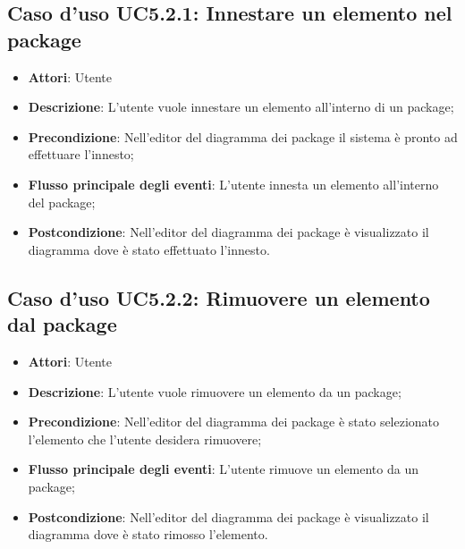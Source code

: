 \documentclass[../AnalisiDeiRequisiti.tex]{subfiles}
\begin{document}
			\subsection{Caso d'uso UC5.2.1: Innestare un elemento nel package}
			\begin{itemize}
				\item \textbf{Attori}: Utente
				\item \textbf{Descrizione}: L'utente vuole innestare un elemento all'interno di un package;
				\item \textbf{Precondizione}: Nell'editor del diagramma dei package il sistema è pronto ad effettuare l'innesto;
				\item \textbf{Flusso principale degli eventi}: L'utente innesta un elemento all'interno del package;
				\item \textbf{Postcondizione}: Nell'editor del diagramma dei package è visualizzato il diagramma dove è stato effettuato l'innesto.
			\end{itemize}
			\subsection{Caso d'uso UC5.2.2: Rimuovere un elemento dal package}
			\begin{itemize}
				\item \textbf{Attori}: Utente
				\item \textbf{Descrizione}: L'utente vuole rimuovere un elemento da un package;
				\item \textbf{Precondizione}: Nell'editor del diagramma dei package è stato selezionato l'elemento che l'utente desidera rimuovere;
				\item \textbf{Flusso principale degli eventi}: L'utente rimuove un elemento da un package;
				\item \textbf{Postcondizione}: Nell'editor del diagramma dei package è visualizzato il diagramma dove è stato rimosso l'elemento.
			\end{itemize}
\end{document}
